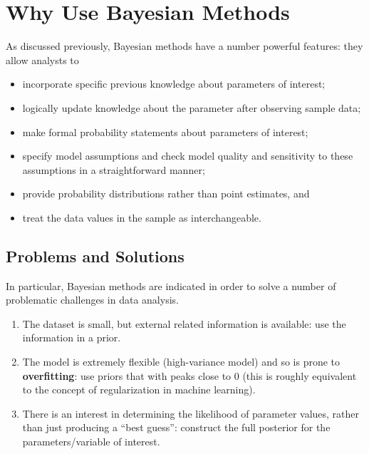 \section{Why Use Bayesian Methods}
As discussed previously, Bayesian methods have a number powerful features: they allow analysts to  
\begin{itemize}[noitemsep]
	\item incorporate specific previous knowledge about parameters of interest;
  \item logically update knowledge about the parameter after observing sample data;
  \item make formal probability statements about parameters of interest;
	\item specify model assumptions and check model quality and sensitivity to these assumptions in a straightforward manner;
  \item provide probability distributions rather than point estimates, and 
	\item treat the data values in the sample as interchangeable. 
\end{itemize} 

\subsection{Problems and Solutions}
In particular, Bayesian methods are indicated in order to solve a number of problematic challenges in data analysis.
\begin{enumerate}
\item The dataset is small, but external related information is available: use the information in a prior. 
\item The model is extremely flexible (high-variance model) and so is prone to \textbf{overfitting}: use priors that with peaks close to 0 (this is roughly equivalent to the concept of regularization in machine learning).
\item There is an interest in determining the likelihood of parameter values, rather than just producing a ``best guess'': construct the full posterior for the parameters/variable of interest. 
\end{enumerate}

